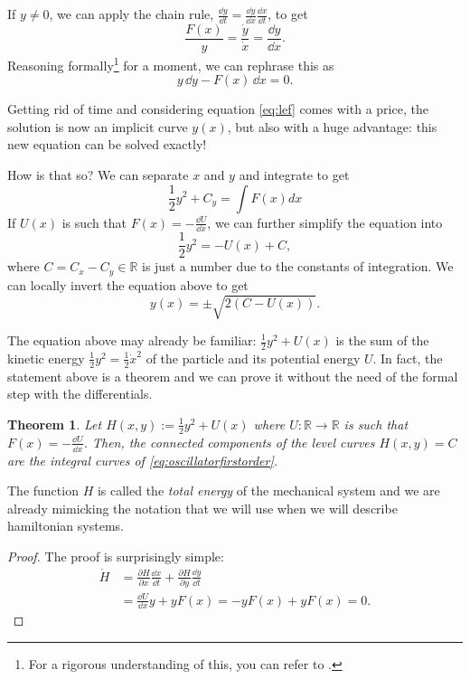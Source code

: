 \documentclass[english,fontsize=11pt,paper=b5]{scrbook}
\newtheorem{theorem}{Theorem}[chapter]
\theoremstyle{definition}
\begin{document}
    If $y\neq0$, we can apply the chain rule, $\frac{\dd y}{\dd t} = \frac{\dd y}{\dd x} \frac{\dd x}{\dd t}$, to get
    \begin{equation}\label{eq:lef}
      \frac{F(x)}y = \frac{\dot y}{\dot x} = \frac{\dd y}{\dd x}.
    \end{equation}
    Reasoning formally\footnote{For a rigorous understanding of this, you can refer to \cite[Equation (5.1) with $f=y$ and Remark 5.1.3]{lectures:aom:seri}.} for a moment, we can rephrase this as
    \begin{equation}
      y\,\dd y - F(x)\, \dd x = 0.
    \end{equation}

    Getting rid of time and considering equation \eqref{eq:lef} comes with a price, the solution is now an implicit curve $y(x)$, but also with a huge advantage: this new equation can be solved exactly!

    How is that so? We can separate $x$ and $y$ and integrate to get
    \begin{equation}
      \frac12 y^2 + C_y = \int F(x) dx
    \end{equation}
    If $U(x)$ is such that $F(x) = -\frac{\dd U}{\dd x}$, we can further simplify the equation into
    \begin{equation}
      \frac12 y^2 = -U(x) + C,
    \end{equation}
    where $C = C_x - C_y \in\mathbb{R}$ is just a number due to the constants of integration.
    We can locally invert the equation above to get
    \begin{equation}
      y(x) = \pm \sqrt{2(C-U(x))}.
    \end{equation}

    The equation above may already be familiar: $\frac12 y^2 + U(x)$ is the sum of the kinetic energy $\frac12 y^2 = \frac12 {\dot x}^2$ of the particle and its potential energy $U$. In fact, the statement above is a theorem and we can prove it without the need of the formal step with the differentials.

    \begin{theorem}\label{thm:ham1}
      Let $H(x, y) := \frac12 y^2 + U(x)$ where $U:\mathbb{R}\to\mathbb{R}$ is such that $F(x) = -\frac{\dd U}{\dd x}$.
      Then, the connected components of the level curves $H(x,y) = C$ are the integral curves of \eqref{eq:oscillatorfirstorder}.
    \end{theorem}
    The function $H$ is called the \emph{total energy} of the mechanical system and we are already mimicking the notation that we will use when we will describe hamiltonian systems.
    \begin{proof}
      The proof is surprisingly simple:
      \begin{align}
        \dot H & = \frac{\partial H}{\partial x}\frac{\dd x}{\dd t} + \frac{\partial H}{\partial y}\frac{\dd y}{\dd t} \\
               & = \frac{\dd U}{\dd x} y + y F(x)
               = -y F(x) + y F(x) = 0.
      \end{align}
    \end{proof}
\end{document}
